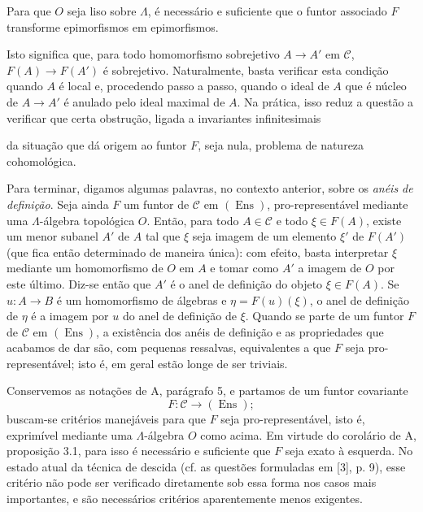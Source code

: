  Para que $O$ seja liso sobre $\Lambda$, é necessário
e suficiente que o funtor associado $F$ transforme epimorfismos em
epimorfismos.

Isto significa que, para todo homomorfismo sobrejetivo
$A\longrightarrow A'$ em $\mathcal C$, $F(A)\longrightarrow F(A')$ é
sobrejetivo. Naturalmente, basta verificar esta condição quando $A$ é local
e, procedendo passo a passo, quando o ideal de $A$ que é núcleo de
$A\longrightarrow A'$ é anulado pelo ideal maximal de $A$. Na prática,
isso reduz a questão a verificar que certa obstrução, ligada a invariantes
infinitesimais

da situação que dá origem ao funtor $F$, seja nula, problema de natureza
cohomológica.

Para terminar, digamos algumas palavras, no contexto anterior, sobre os
\emph{anéis de definição}. Seja ainda $F$ um funtor de $\mathcal C$ em
$(\operatorname{Ens})$, pro-representável mediante uma $\Lambda$-álgebra
topológica $O$. Então, para todo $A\in\mathcal C$ e todo $\xi\in F(A)$,
existe um menor subanel $A'$ de $A$ tal que $\xi$ seja imagem de um elemento
$\xi'$ de $F(A')$ (que fica então determinado de maneira única): com efeito,
basta interpretar $\xi$ mediante um homomorfismo de $O$ em $A$ e tomar como
$A'$ a imagem de $O$ por este último. Diz-se então que $A'$ é o anel
de definição do objeto $\xi\in F(A)$. Se $u:A\longrightarrow B$ é um
homomorfismo de álgebras e $\eta=F(u)(\xi)$, o anel de definição de $\eta$
é a imagem por $u$ do anel de definição de $\xi$. Quando se parte de um
funtor $F$ de $\mathcal C$ em $(\operatorname{Ens})$, a existência dos
anéis de definição e as propriedades que acabamos de dar são, com pequenas
ressalvas, equivalentes a que $F$ seja pro-representável; isto é, em
geral estão longe de ser triviais.


Conservemos as notações de A, parágrafo 5, e partamos de um funtor covariante
\[
  F:\mathcal C\longrightarrow(\operatorname{Ens});
\]
buscam-se critérios manejáveis para que $F$ seja pro-representável, isto é,
exprimível mediante uma $\Lambda$-álgebra $O$ como acima. Em virtude do
corolário de A, proposição 3.1, para isso é necessário e suficiente que $F$ seja
exato à esquerda. No estado atual da técnica de descida (cf. as
questões formuladas em [3], p. 9), esse critério não pode ser verificado
diretamente sob essa forma nos casos mais importantes, e são necessários
critérios aparentemente menos exigentes.

